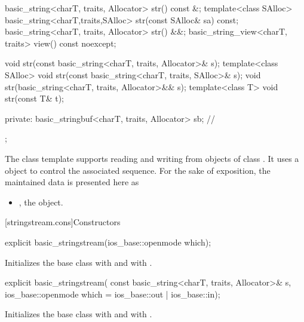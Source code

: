 \begin{codeblock}
{{    basic_string<charT, traits, Allocator> str() const &;
    template<class SAlloc>
      basic_string<charT,traits,SAlloc> str(const SAlloc& sa) const;
    basic_string<charT, traits, Allocator> str() &&;
    basic_string_view<charT, traits> view() const noexcept;

    void str(const basic_string<charT, traits, Allocator>& s);
    template<class SAlloc>
      void str(const basic_string<charT, traits, SAlloc>& s);
    void str(basic_string<charT, traits, Allocator>&& s);
    template<class T>
      void str(const T& t);

  private:
    basic_stringbuf<charT, traits, Allocator> sb;   // \expos
  };
}
\end{codeblock}

\pnum
The
class template
supports reading and writing from objects of class
.
It uses a
object to control the associated sequence.
For the sake of exposition, the maintained data is presented here as
\begin{itemize}
\item
{}, the  object.
\end{itemize}

[stringstream.cons]{Constructors}

%
\begin{itemdecl}
explicit basic_stringstream(ios_base::openmode which);
\end{itemdecl}

\begin{itemdescr}
\pnum
\effects
Initializes the base class with
and
with
.
\end{itemdescr}

%
\begin{itemdecl}
explicit basic_stringstream(
  const basic_string<charT, traits, Allocator>& s,
  ios_base::openmode which = ios_base::out | ios_base::in);
\end{itemdecl}

\begin{itemdescr}
\pnum
\effects
Initializes the base class with
and
with
.
\end{itemdescr}

